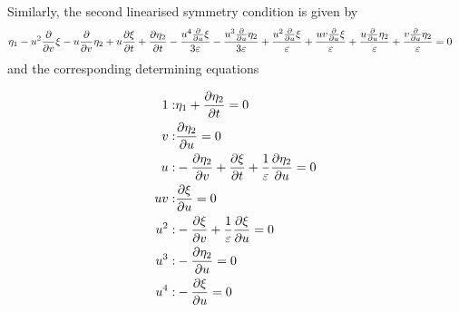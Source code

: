 Similarly, the second linearised symmetry condition is given by
\begin{align}
\eta_1 - u^{2} \pdv{}{v} \xi - u \pdv{}{v} \eta_2 + u \pdv{\xi}{t} + \pdv{\eta_2}{t} - \frac{u^{4} \pdv{}{u} \xi}{3 \varepsilon} - \frac{u^{3} \pdv{}{u} \eta_2}{3 \varepsilon} + \frac{u^{2} \pdv{}{u} \xi}{\varepsilon} + \frac{u v \pdv{}{u} \xi}{\varepsilon} + \frac{u \pdv{}{u} \eta_2}{\varepsilon} + \frac{v \pdv{}{u} \eta_2}{\varepsilon}&=0\label{eq:BZ_lin_sym_1}
\end{align}
and the corresponding determining equations

\begin{align*}
1:&\eta_1 + \pdv{\eta_2}{t}=0\\
v:&\pdv{\eta_2}{u}=0\\
u:&- \pdv{\eta_2}{v}  + \pdv{\xi}{t} + \frac{1}{\varepsilon}\pdv{\eta_2}{u} =0\\
u v:&\pdv{\xi}{u}=0\\
u^{2}:&- \pdv{\xi}{v} + \frac{1}{\varepsilon}\pdv{\xi}{u} =0\\
u^{3}:&- \pdv{\eta_2}{u}=0\\
u^{4}:&- \pdv{\xi}{u}=0\\
\end{align*}